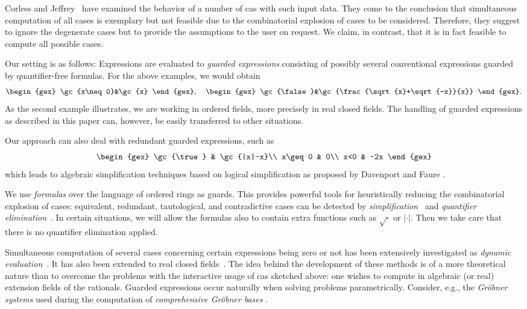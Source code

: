 Corless and Jeffrey~\cite{CorlessJeffrey:92} have examined the
behavior of a number of {\sc cas} with such input data. They come to
the conclusion that simultaneous computation of all cases is exemplary
but not feasible due to the combinatorial explosion of cases to be
considered. Therefore, they suggest to ignore the degenerate cases but
to provide the assumptions to the user on request. We claim, in
contrast, that it is in fact feasible to compute all possible cases.

Our setting is as follows: Expressions are evaluated to {\em guarded
expressions} consisting of possibly several conventional expressions
guarded by quantifier-free formulas. For the above examples, we would
obtain
$$
\begin{gex}
\gc{x\neq0}&\gc{x}
\end{gex},\quad
\begin{gex}
\gc{\false}&\gc{\frac{\sqrt{x}+\sqrt{-x}}{x}}
\end{gex}.
$$
As the second example illustrates, we are working in ordered fields,
more precisely in real closed fields. The handling of guarded
expressions as described in this paper can, however, be easily
transferred to other situations.

Our approach can also deal with redundant guarded expressions, such as
$$
\begin{gex}
\gc{\true} & \gc{|x|-x}\\
x\geq0 & 0\\
x<0 & -2x
\end{gex}
$$
which leads to algebraic simplification techniques based on logical
simplification as proposed by Davenport and
Faure \cite{DavenportFaure:94}.

We use {\em formulas} over the language of ordered rings as guards.
This provides powerful tools for heuristically reducing the
combinatorial explosion of cases: equivalent, redundant, tautological,
and contradictive cases can be detected by {\em
simplification}~\cite{DolzmannSturm:95} and {\em quantifier
elimination}~\cite{Tarski:48,Collins:75,Weispfenning:88,LoosWeispfenning:93,Weispfenning:96,Weispfenning:94}.
In certain situations, we will allow the formulas also to contain
extra functions such as $\sqrt{\cdot}$ or $|\cdot|$. Then we take care
that there is no quantifier elimination applied.

Simultaneous computation of several cases concerning certain
expressions being zero or not has been extensively investigated as
{\em dynamic
evaluation}~\cite{GomezDiaz:93,DuvalReynaud:94,DuvalReynaud:94a,
BroadberryGomezDiazWatt:95}. It has also been extended to real closed
fields~\cite{DuvalGonzalesVega:93}. The idea behind the development of
these methods is of a more theoretical nature than to overcome the
problems with the interactive usage of {\sc cas} sketched above: one
wishes to compute in algebraic (or real) extension fields of the
rationals. Guarded expressions occur naturally when solving problems
parametrically. Consider, e.g., the {\em Gr\"obner systems} used
during the computation of {\em comprehensive Gr\"obner bases}
\cite{Weispfenning:92}.

